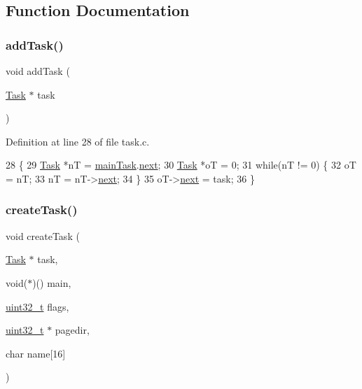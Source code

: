 \subsection{Function Documentation}
\mbox{\label{a00044_a2814ff5e4f081736448dc705b05edcd1_a2814ff5e4f081736448dc705b05edcd1}} 
\subsubsection{\texorpdfstring{add\+Task()}{addTask()}}
{\footnotesize\ttfamily void add\+Task (\begin{DoxyParamCaption}\item[{\hyperlink{a00134}{Task} $\ast$}]{task }\end{DoxyParamCaption})}



Definition at line 28 of file task.\+c.


\begin{DoxyCode}
28                          \{
29     \hyperlink{a00134}{Task} *nT = \hyperlink{a00044_a228ac88416ebaa8713846e3e5e3e9b6d_a228ac88416ebaa8713846e3e5e3e9b6d}{mainTask}.\hyperlink{a00134_a8b6b50960a19f7bae344ef0cc8ec4e7d_a8b6b50960a19f7bae344ef0cc8ec4e7d}{next};
30     \hyperlink{a00134}{Task} *oT = 0;
31     \textcolor{keywordflow}{while}(nT != 0) \{
32         oT = nT;
33         nT = nT->\hyperlink{a00134_a8b6b50960a19f7bae344ef0cc8ec4e7d_a8b6b50960a19f7bae344ef0cc8ec4e7d}{next};
34     \}
35     oT->\hyperlink{a00134_a8b6b50960a19f7bae344ef0cc8ec4e7d_a8b6b50960a19f7bae344ef0cc8ec4e7d}{next} = task;
36 \}
\end{DoxyCode}
\mbox{\label{a00044_ad60a944f16bf46088320833cf2464e1e_ad60a944f16bf46088320833cf2464e1e}} 
\subsubsection{\texorpdfstring{create\+Task()}{createTask()}}
{\footnotesize\ttfamily void create\+Task (\begin{DoxyParamCaption}\item[{\hyperlink{a00134}{Task} $\ast$}]{task,  }\item[{void($\ast$)()}]{main,  }\item[{\hyperlink{a00092_a435d1572bf3f880d55459d9805097f62_a435d1572bf3f880d55459d9805097f62}{uint32\+\_\+t}}]{flags,  }\item[{\hyperlink{a00092_a435d1572bf3f880d55459d9805097f62_a435d1572bf3f880d55459d9805097f62}{uint32\+\_\+t} $\ast$}]{pagedir,  }\item[{char}]{name\mbox{[}16\mbox{]} }\end{DoxyParamCaption})}



